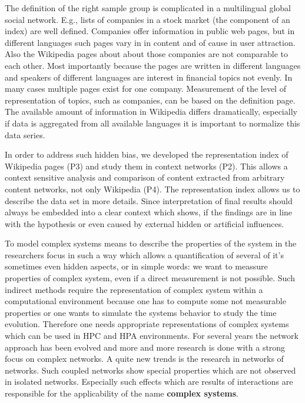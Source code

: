 \documentclass[a4paper,10pt]{scrbook}
\begin{document}
The definition of the right sample group is complicated in a multilingual global social network. E.g., lists of companies in a stock market (the component of an index) are well defined. Companies offer information in public web pages, but in different languages such pages vary in in content and of cause in user attraction. Also the Wikipedia pages about about those companies are not comparable to each other. Most importantly because the pages are written in different languages and speakers of different languages are interest in financial topics not evenly.
In many cases multiple pages exist for one company. Measurement of the level of representation of topics, such as companies, can be based on the definition page.
The available amount of information in Wikipedia differs dramatically, especially if data is aggregated from all available languages it is important to normalize this data series. 

In order to address such hidden bias, we developed the representation index of Wikipedia pages (P3) and study them in context networks (P2). This allows a context sensitive analysis and comparison of content extracted from arbitrary content networks, not only Wikipedia (P4). The representation index allows us to describe the data set in more details. Since interpretation of final results should always be embedded into a clear context which shows, if the findings are in line with the hypothesis or even caused by external hidden or artificial influences.

%
% 
To model complex systems means to describe the properties of the system in the researchers focus in such a way which allows 
a quantification of several of it's sometimes even hidden aspects, or in simple words: we want to meassure properties of 
complex system, even if a direct measurement is not possible. 
Such indirect methods require the representation of complex system within a computational environment because one has to 
compute some not measurable properties or one wants to simulate the systems behavior to study the time evolution. Therefore one needs 
appropriate representations of complex systems which can be used in HPC 
 and HPA  environments. 
For several years the network approach has been evolved and more and more research is done with a strong focus on complex networks.
A quite new trends is the research in networks of networks. Such coupled networks show special properties which are not
observed in isolated networks. Especially such effects which are results of interactions are responsible for the applicability 
of the name \textbf{complex systems}. 
\end{document}
